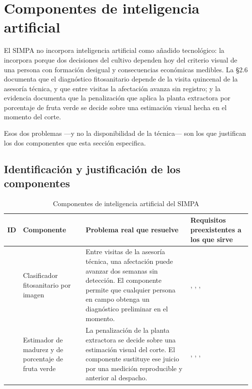 
\section{Componentes de inteligencia artificial}
\label{sec:ia}

El SIMPA no incorpora inteligencia artificial como añadido tecnológico: la incorpora porque dos
decisiones del cultivo dependen hoy del criterio visual de una persona con formación desigual y
consecuencias económicas medibles. La \S2.6 documenta que el diagnóstico fitosanitario depende de la
visita quincenal de la asesoría técnica, y que entre visitas la afectación avanza sin registro; y la
evidencia  documenta que la penalización que aplica la planta extractora por porcentaje de
fruta verde se decide sobre una estimación visual hecha en el momento del corte.

Esos dos problemas ---y no la disponibilidad de la técnica--- son los que justifican los dos
componentes que esta sección especifica.

\subsection{Identificación y justificación de los componentes}

\begin{table}[H]
\centering\footnotesize
\caption{Componentes de inteligencia artificial del SIMPA}
\label{tab:comp-ia}
\begin{tabular}{|C{1.5cm}|L{4.2cm}|L{4.6cm}|L{4.6cm}|}
\hline
{}\textbf{ID} & \textbf{Componente} & \textbf{Problema real que resuelve} & \textbf{Requisitos preexistentes a los que sirve}\\ \hline
{} & Clasificador fitosanitario por imagen & Entre visitas de la asesoría técnica, una afectación puede avanzar dos semanas sin detección. El componente permite que cualquier persona en campo obtenga un diagnóstico preliminar en el momento. & , , , \\ \hline
{} & Estimador de madurez y de porcentaje de fruta verde & La penalización de la planta extractora se decide sobre una estimación visual del corte. El componente sustituye ese juicio por una medición reproducible y anterior al despacho. & , , , \\ \hline
\end{tabular}
\end{table}

